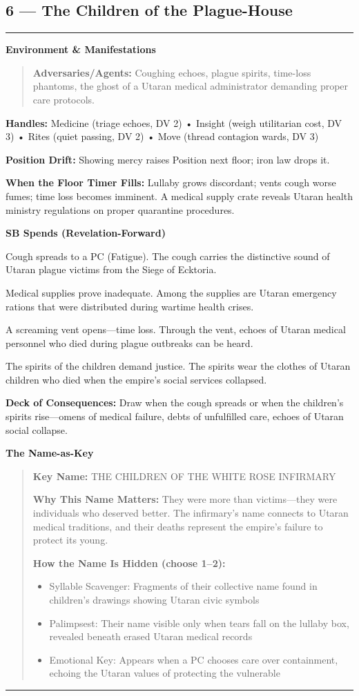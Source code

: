 \documentclass[18pt, letterpaper, twoside]{article}
\newenvironment{floorbox}[1]{%
    \begin{center}
    \begin{minipage}{0.95\textwidth}
    \subsection*{#1}
    \vspace{-0.5em}
    \rule{\textwidth}{0.5pt}
    \vspace{0.5em}
}{%
    \vspace{0.5em}
    \rule{\textwidth}{0.5pt}
    \end{minipage}
    \end{center}
}
\newenvironment{gmnote}[1]{%
    \vspace{0.5em}
    \noindent\textbf{#1}
    \begin{quote}
}{%
    \end{quote}
    \vspace{0.5em}
}
\newcommand{\handles}[1]{\noindent\textbf{Handles:} #1\par}
\newcommand{\sbitem}[2]{\item[#1 SB:] #2}
\newcommand{\deckdraw}[1]{\noindent\textbf{Deck of Consequences:} #1\par}
\newcommand{\keyname}[1]{\noindent\textbf{Key Name:} #1\par}
\newcommand{\nameimportance}[1]{\noindent\textbf{Why This Name Matters:} #1\par}
\begin{document}
\begin{floorbox}{6 --- The Children of the Plague-House}
\begin{gmnote}{Environment \& Manifestations}
\textbf{Adversaries/Agents:} Coughing echoes, plague spirits, time-loss phantoms, the ghost of a Utaran medical administrator demanding proper care protocols.
\end{gmnote}

\handles{Medicine (triage echoes, DV 2) • Insight (weigh utilitarian cost, DV 3) • Rites (quiet passing, DV 2) • Move (thread contagion wards, DV 3)}

\textbf{Position Drift:} Showing mercy raises Position next floor; iron law drops it.

\textbf{When the Floor Timer Fills:} Lullaby grows discordant; vents cough worse fumes; time loss becomes imminent. A medical supply crate reveals Utaran health ministry regulations on proper quarantine procedures.

\textbf{SB Spends (Revelation-Forward)}
\begin{description}[leftmargin=*, style=unboxed]
    \sbitem{1}{Cough spreads to a PC (Fatigue). The cough carries the distinctive sound of Utaran plague victims from the Siege of Ecktoria.}
    \sbitem{2}{Medical supplies prove inadequate. Among the supplies are Utaran emergency rations that were distributed during wartime health crises.}
    \sbitem{3}{A screaming vent opens---time loss. Through the vent, echoes of Utaran medical personnel who died during plague outbreaks can be heard.}
    \sbitem{4+}{The spirits of the children demand justice. The spirits wear the clothes of Utaran children who died when the empire's social services collapsed.}
\end{description}

\deckdraw{Draw when the cough spreads or when the children's spirits rise---omens of medical failure, debts of unfulfilled care, echoes of Utaran social collapse.}

\begin{gmnote}{The Name-as-Key}
\keyname{THE CHILDREN OF THE WHITE ROSE INFIRMARY}
\nameimportance{They were more than victims---they were individuals who deserved better. The infirmary's name connects to Utaran medical traditions, and their deaths represent the empire's failure to protect its young.}

\textbf{How the Name Is Hidden (choose 1--2):}
\begin{itemize}[leftmargin=*]
    \item Syllable Scavenger: Fragments of their collective name found in children's drawings showing Utaran civic symbols
    \item Palimpsest: Their name visible only when tears fall on the lullaby box, revealed beneath erased Utaran medical records
    \item Emotional Key: Appears when a PC chooses care over containment, echoing the Utaran values of protecting the vulnerable
\end{itemize}


\end{gmnote}
\end{floorbox}
\end{document}
